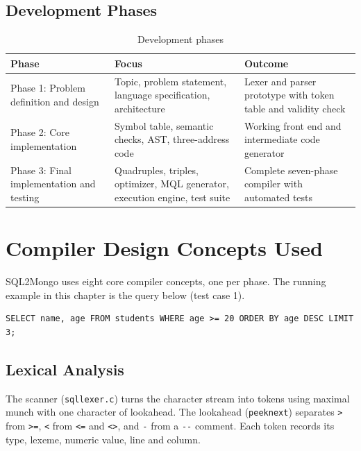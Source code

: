 \documentclass[12pt,a4paper]{report}
\newcommand{\codeus}{\textunderscore\allowbreak}
\DeclareRobustCommand{\code}[1]{\texttt{\let\_\codeus #1}}
\begin{document}
\section{Development Phases}
\begin{table}[H]
\centering\small
\begin{tabularx}{\linewidth}{|P{3.6cm}|L|L|}
\hline
\textbf{Phase} & \textbf{Focus} & \textbf{Outcome} \\ \hline
Phase 1: Problem definition and design & Topic, problem statement, language specification, architecture & Lexer and parser prototype with token table and validity check \\ \hline
Phase 2: Core implementation & Symbol table, semantic checks, AST, three-address code & Working front end and intermediate code generator \\ \hline
Phase 3: Final implementation and testing & Quadruples, triples, optimizer, MQL generator, execution engine, test suite & Complete seven-phase compiler with automated tests \\ \hline
\end{tabularx}
\caption{Development phases}
\end{table}

\chapter{Compiler Design Concepts Used}\label{ch:concepts}
SQL2Mongo uses eight core compiler concepts, one per phase. The running example in this chapter is the query below (test case 1).
\begin{lstlisting}
SELECT name, age FROM students WHERE age >= 20 ORDER BY age DESC LIMIT 3;
\end{lstlisting}

\section{Lexical Analysis}
The scanner (\code{sql\_lexer.c}) turns the character stream into tokens using maximal munch with one character of lookahead. The lookahead (\code{peek\_next}) separates \code{>} from \code{>=}, \code{<} from \code{<=} and \code{<>}, and \code{-} from a \code{-{}-} comment. Each token records its type, lexeme, numeric value, line and column.
\end{document}
